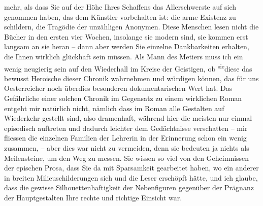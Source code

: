                mehr, als dass Sie auf der Höhe Ihres Schaffens das Allerschwerste auf sich genommen
               haben, das dem Künstler vorbehalten ist: die arme Existenz zu schildern, die Tragödie
               der unzähligen Anonymen. Diese Menschen lesen nicht die Bücher in den ersten vier
               Wochen, insolange sie modern sind, sie kommen erst langsam an sie heran – dann aber
               werden Sie einzelne Dankbarkeiten erhalten, die Ihnen wirklich glückhaft sein müssen.
               Als Mann des Metiers muss ich ein wenig neugierig sein auf den Wiederhall im Kreise
               der Geistigen, ob \substVorne{}\textsuperscript{sie}\substDazwischen{}diese\substHinten{} das bewusst Heroische dieser Chronik wahrnehmen und würdigen können, das für
               uns Oesterreicher noch überdies besonderen
               dokumentarischen Wert hat. Das Gefährlich\introOben{}e\introOben{} einer solchen
                  Chronik im Gegensatz zu
               einem wirk{\pb}lichen Roman entgeht mir
               natürlich nicht, nämlich dass im Roman alle Gestalten auf Wiederkehr gestellt sind,
               also dramenhaft, während hier die meisten nur einmal episodisch auftreten und dadurch
               leichter dem Gedächtnisse verschatten – mir fliessen die einzelnen Familien der
               Lehrerin in der Erinnerung schon ein wenig zusammen, \introOben{}–\introOben{} aber
               dies war nicht zu vermeiden, denn sie bedeuten ja nichts als Meilensteine, um den Weg
               zu messen. Sie wissen so viel von den Geheimnissen der epischen Prosa, dass Sie da
               mit Sparsamkeit gearbeitet haben, wo ein anderer in breiten Milieuschilderungen sich
               und die Leser erschöpft hätte, und ich glaube, dass die gewisse Silhouettenhaftigkeit
               der Nebenfiguren gegenüber der Prägnanz der Hauptgestalten Ihre rechte und richtige
               Einsicht war.\pend
           
